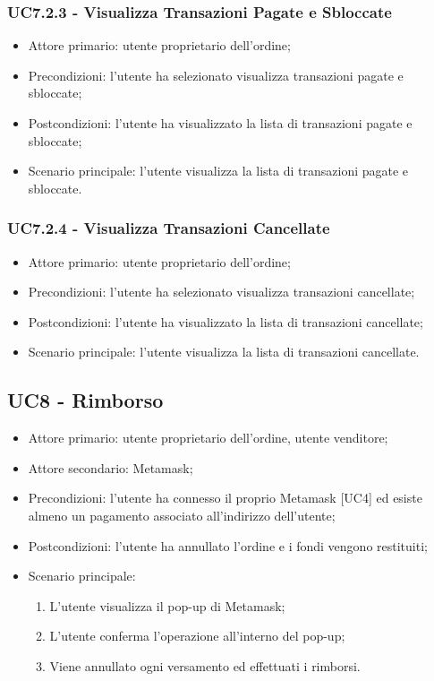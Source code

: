 \subsubsection{UC7.2.3 - Visualizza Transazioni Pagate e Sbloccate}

\begin{itemize}
    \item Attore primario: utente proprietario dell'ordine;
    \item Precondizioni: l'utente ha selezionato visualizza transazioni pagate e sbloccate;
    \item Postcondizioni: l'utente ha visualizzato la lista di transazioni pagate e sbloccate;
    \item Scenario principale: l'utente visualizza la lista di transazioni pagate e sbloccate.
\end{itemize}

\subsubsection{UC7.2.4 - Visualizza Transazioni Cancellate}

\begin{itemize}
    \item Attore primario: utente proprietario dell'ordine;
    \item Precondizioni: l'utente ha selezionato visualizza transazioni cancellate;
    \item Postcondizioni: l'utente ha visualizzato la lista di transazioni cancellate;
    \item Scenario principale: l'utente visualizza la lista di transazioni cancellate.
\end{itemize}

\subsection{UC8 - Rimborso}

\begin{itemize}
    \item Attore primario: utente proprietario dell'ordine, utente venditore;
    \item Attore secondario: Metamask\glo{};
    \item Precondizioni: l'utente ha connesso il proprio Metamask\glo{} [UC4] ed esiste almeno un pagamento associato all'indirizzo dell'utente;
    \item Postcondizioni: l'utente ha annullato l'ordine e i fondi vengono restituiti;
    \item Scenario principale:
          \begin{enumerate}
              \item L'utente visualizza il pop-up di Metamask\glo{};
              \item L'utente conferma l'operazione all'interno del pop-up;
              \item Viene annullato ogni versamento ed effettuati i rimborsi.
          \end{enumerate}
\end{itemize}


\clearpage
